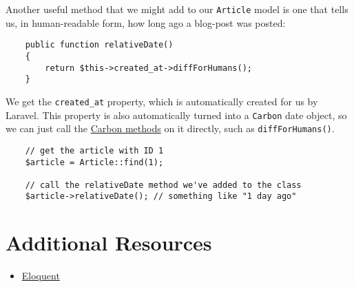 Another useful method that we might add to our \texttt{Article} model is one that tells us, in human-readable form, how long ago a blog-post was posted:

\begin{verbatim}
    public function relativeDate()
    {
        return $this->created_at->diffForHumans();
    }
\end{verbatim}

We get the \texttt{created\_at} property, which is automatically created for us by Laravel. This property is also automatically turned into a \texttt{Carbon} date object, so we can just call the \href{https://carbon.nesbot.com/docs/#api-humandiff}{Carbon methods} on it directly, such as \texttt{diffForHumans()}.

\begin{verbatim}
    // get the article with ID 1
    $article = Article::find(1);

    // call the relativeDate method we've added to the class
    $article->relativeDate(); // something like "1 day ago"
\end{verbatim}



\section{Additional Resources}

\begin{itemize}[leftmargin=*]
    \item \href{http://laravel.com/docs/master/eloquent}{Eloquent}
\end{itemize}
